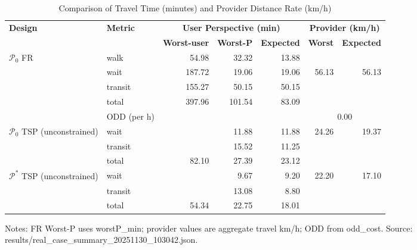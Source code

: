 \begin{table}[t]
\centering
\caption{Comparison of Travel Time (minutes) and Provider Distance Rate (km/h)}
\begin{tabular}{l l r r r r r}
\toprule
\textbf{Design} & \textbf{Metric} & 
\multicolumn{3}{c}{\textbf{User Perspective (min)}} & 
\multicolumn{2}{c}{\textbf{Provider (km/h)}} \\
\cmidrule(lr){3-5}\cmidrule(lr){6-7}
& & \textbf{Worst-user} & \textbf{Worst-P} & \textbf{Expected} & \textbf{Worst} & \textbf{Expected} \\
\midrule
$\mathcal{P}_0$ FR & walk    & 54.98 & 32.32 & 13.88 &        &        \\
                   & wait    & 187.72 & 19.06 & 19.06 & 56.13  & 56.13  \\
                   & transit & 155.27 & 50.15 & 50.15 &        &        \\
                   & total   & 397.96 & 101.54 & 83.09 &       &        \\
                   & ODD (per h) &  &  &  & \multicolumn{2}{c}{0.00} \\
\midrule
$\mathcal{P}_0$ TSP (unconstrained) & wait    &  & 11.88 & 11.88 & 24.26 & 19.37 \\
                                    & transit &  & 15.52 & 11.25 &        &       \\
                                    & total   & 82.10 & 27.39 & 23.12 &        &       \\
\midrule
$\mathcal{P}^*$ TSP (unconstrained) & wait    &  & 9.67 & 9.20 & 22.20 & 17.10 \\
                                    & transit &  & 13.08 & 8.80 &        &       \\
                                    & total   & 54.34 & 22.75 & 18.01 &        &       \\
\bottomrule
\end{tabular}

\vspace{0.5ex}
\small
Notes: FR Worst-P uses worstP\_min; provider values are aggregate travel km/h; ODD from odd\_cost. Source: results/real_case_summary_20251130_103042.json.
\end{table}